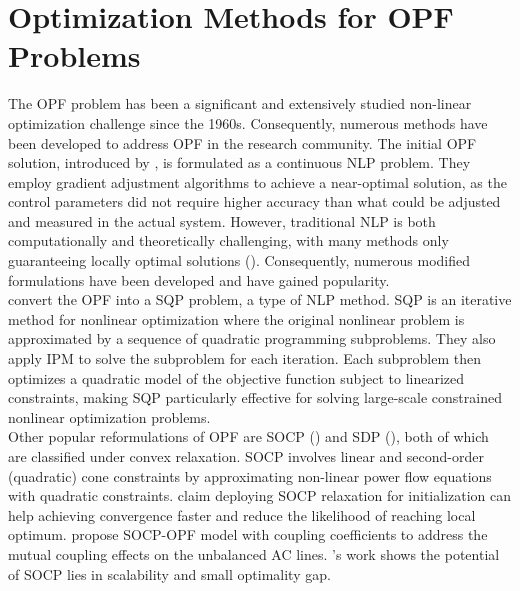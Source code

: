 \section{Optimization Methods for \gls{OPF} Problems}
The \gls{OPF} problem has been a significant and extensively studied non-linear optimization challenge since the 1960s. Consequently, numerous methods have been developed to address \gls{OPF} in the research community. The initial \gls{OPF} solution, introduced by \cite{Dommel1968}, is formulated as a continuous \gls{NLP} problem. They employ gradient adjustment algorithms to achieve a near-optimal solution, as the control parameters did not require higher accuracy than what could be adjusted and measured in the actual system. However, traditional \gls{NLP} is both computationally and theoretically challenging, with many methods only guaranteeing locally optimal solutions (\cite{wei1998interior}). Consequently, numerous modified formulations have been developed and have gained popularity.\\
\cite{nejdawi2000efficient} convert the OPF into a \gls{SQP} problem, a type of \gls{NLP} method. \gls{SQP} is an iterative method for nonlinear optimization where the original nonlinear problem is approximated by a sequence of quadratic programming subproblems. They also apply \gls{IPM} to solve the subproblem for each iteration. Each subproblem then optimizes a quadratic model of the objective function subject to linearized constraints, making \gls{SQP} particularly effective for solving large-scale constrained nonlinear optimization problems.\\
Other popular reformulations of \gls{OPF} are \gls{SOCP} (\cite{jabr2006radial, marley2016solving, Kayacik2021, chowdhury2023second}) and \gls{SDP} (\cite{bai2008semidefinite, lavaei2011zero, madani2014convex, madani2015promises}), both of which are classified under convex relaxation. \gls{SOCP} involves linear and second-order (quadratic) cone constraints by approximating non-linear power flow equations with quadratic constraints. \cite{marley2016solving} claim deploying \gls{SOCP} relaxation for initialization can help achieving convergence faster and reduce the likelihood of reaching local optimum. \cite{chowdhury2023second} propose \gls{SOCP}-\gls{OPF} model with coupling coefficients to address the mutual coupling effects on the unbalanced AC lines. \cite{Kayacik2021}'s work shows the potential of \gls{SOCP} lies in scalability and small optimality gap.\\
